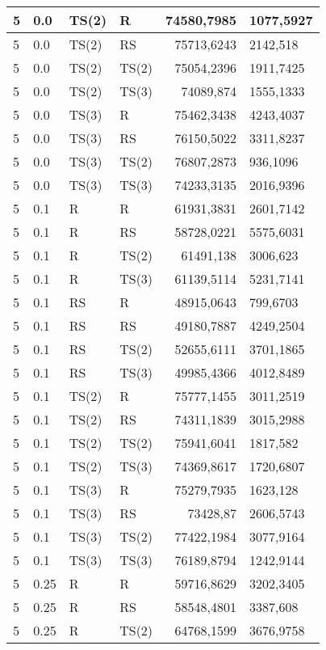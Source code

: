 \documentclass[twoside]{iisthesis}
\begin{document}
\begin{center}
\begin{longtable}{|l|l|l|l|r@{$\pm$}l|}
		5 & 0.0 & TS(2) & R & 74580,7985 & 1077,5927\\ \hline
		5 & 0.0 & TS(2) & RS & 75713,6243 & 2142,518\\ \hline
		5 & 0.0 & TS(2) & TS(2) & 75054,2396 & 1911,7425\\ \hline
		5 & 0.0 & TS(2) & TS(3) & 74089,874 & 1555,1333\\ \hline
		5 & 0.0 & TS(3) & R & 75462,3438 & 4243,4037\\ \hline
		5 & 0.0 & TS(3) & RS & 76150,5022 & 3311,8237\\ \hline
		5 & 0.0 & TS(3) & TS(2) & 76807,2873 & 936,1096\\ \hline
		5 & 0.0 & TS(3) & TS(3) & 74233,3135 & 2016,9396\\ \hline
		5 & 0.1 & R & R & 61931,3831 & 2601,7142\\ \hline
		5 & 0.1 & R & RS & 58728,0221 & 5575,6031\\ \hline
		5 & 0.1 & R & TS(2) & 61491,138 & 3006,623\\ \hline
		5 & 0.1 & R & TS(3) & 61139,5114 & 5231,7141\\ \hline
		5 & 0.1 & RS & R & 48915,0643 & 799,6703\\ \hline
		5 & 0.1 & RS & RS & 49180,7887 & 4249,2504\\ \hline
		5 & 0.1 & RS & TS(2) & 52655,6111 & 3701,1865\\ \hline
		5 & 0.1 & RS & TS(3) & 49985,4366 & 4012,8489\\ \hline
		5 & 0.1 & TS(2) & R & 75777,1455 & 3011,2519\\ \hline
		5 & 0.1 & TS(2) & RS & 74311,1839 & 3015,2988\\ \hline
		5 & 0.1 & TS(2) & TS(2) & 75941,6041 & 1817,582\\ \hline
		5 & 0.1 & TS(2) & TS(3) & 74369,8617 & 1720,6807\\ \hline
		5 & 0.1 & TS(3) & R & 75279,7935 & 1623,128\\ \hline
		5 & 0.1 & TS(3) & RS & 73428,87 & 2606,5743\\ \hline
		5 & 0.1 & TS(3) & TS(2) & 77422,1984 & 3077,9164\\ \hline
		5 & 0.1 & TS(3) & TS(3) & 76189,8794 & 1242,9144\\ \hline
		5 & 0.25 & R & R & 59716,8629 & 3202,3405\\ \hline
		5 & 0.25 & R & RS & 58548,4801 & 3387,608\\ \hline
		5 & 0.25 & R & TS(2) & 64768,1599 & 3676,9758\\ \hline

\end{longtable}
\end{center}
\end{document}
